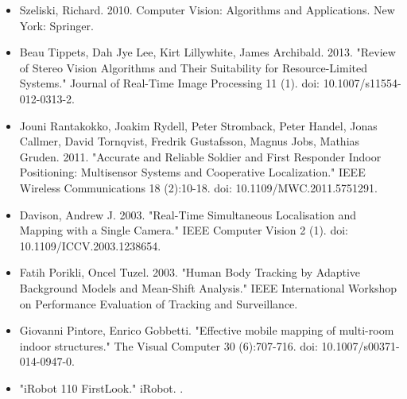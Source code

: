\begin{itemize}
  \item Szeliski, Richard. 2010. Computer Vision: Algorithms and Applications. New York: Springer.
  
  \item Beau Tippets, Dah Jye Lee, Kirt Lillywhite, James Archibald. 2013. "Review of Stereo Vision Algorithms and Their Suitability for Resource-Limited Systems." Journal of Real-Time Image Processing 11 (1). doi: 10.1007/s11554-012-0313-2.
  
  \item Jouni Rantakokko, Joakim Rydell, Peter Stromback, Peter Handel, Jonas Callmer, David Tornqvist, Fredrik Gustafsson, Magnus Jobs, Mathias Gruden. 2011. "Accurate and Reliable Soldier and First Responder Indoor Positioning: Multisensor Systems and Cooperative Localization." IEEE Wireless Communications 18 (2):10-18. doi: 10.1109/MWC.2011.5751291.
  
  \item Davison, Andrew J. 2003. "Real-Time Simultaneous Localisation and Mapping with a Single Camera."  IEEE Computer Vision 2 (1). doi: 10.1109/ICCV.2003.1238654.
  
  \item Fatih Porikli, Oncel Tuzel. 2003. "Human Body Tracking by Adaptive Background Models and Mean-Shift Analysis." IEEE International Workshop on Performance Evaluation of Tracking and Surveillance.
  
  \item Giovanni Pintore, Enrico Gobbetti. "Effective mobile mapping of multi-room indoor structures."  The Visual Computer 30 (6):707-716. doi: 10.1007/s00371-014-0947-0.
  
  \item "iRobot 110 FirstLook." iRobot. .

\end{itemize}

